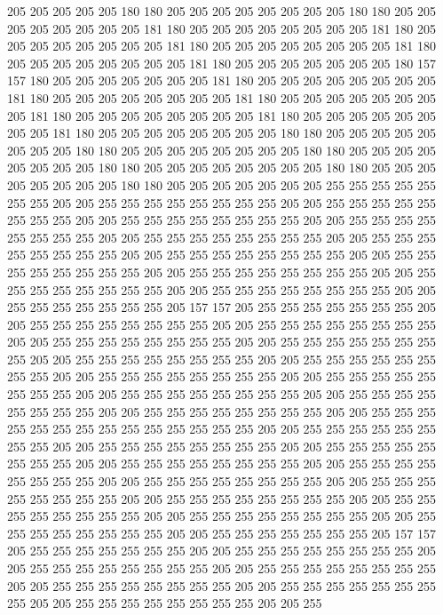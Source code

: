 205 205 205 205 205 180 180 205 205 205 205 205 205 205 205 180 180 205 205 205
205 205 205 205 205 181 180 205 205 205 205 205 205 205 205 181 180 205 205 205
205 205 205 205 205 181 180 205 205 205 205 205 205 205 205 181 180 205 205 205
205 205 205 205 205 181 180 205 205 205 205 205 205 205 180 157 157 180 205 205
205 205 205 205 205 181 180 205 205 205 205 205 205 205 205 181 180 205 205 205
205 205 205 205 205 181 180 205 205 205 205 205 205 205 205 181 180 205 205 205
205 205 205 205 205 181 180 205 205 205 205 205 205 205 205 181 180 205 205 205
205 205 205 205 205 180 180 205 205 205 205 205 205 205 205 180 180 205 205 205
205 205 205 205 205 180 180 205 205 205 205 205 205 205 205 180 180 205 205 205
205 205 205 205 205 180 180 205 205 205 205 205 205 205 205 180 180 205 205 205
205 205 205 205 255 255 255 255 255 255 255 205 205 255 255 255 255 255 255 255
255 205 205 255 255 255 255 255 255 255 255 205 205 255 255 255 255 255 255 255
255 205 205 255 255 255 255 255 255 255 255 205 205 255 255 255 255 255 255 255
255 205 205 255 255 255 255 255 255 255 255 205 205 255 255 255 255 255 255 255
255 205 205 255 255 255 255 255 255 255 255 205 205 255 255 255 255 255 255 255
255 205 205 255 255 255 255 255 255 255 255 205 205 255 255 255 255 255 255 255
255 205 205 255 255 255 255 255 255 255 205 157 157 205 255 255 255 255 255 255
255 205 205 255 255 255 255 255 255 255 255 205 205 255 255 255 255 255 255 255
255 205 205 255 255 255 255 255 255 255 255 205 205 255 255 255 255 255 255 255
255 205 205 255 255 255 255 255 255 255 255 205 205 255 255 255 255 255 255 255
255 205 205 255 255 255 255 255 255 255 255 205 205 255 255 255 255 255 255 255
255 205 205 255 255 255 255 255 255 255 255 205 205 255 255 255 255 255 255 255
255 205 205 255 255 255 255 255 255 255 255 205 205 255 255 255 255 255 255 255
255 255 255 255 255 255 255 205 205 255 255 255 255 255 255 255 255 205 205 255
255 255 255 255 255 255 255 205 205 255 255 255 255 255 255 255 255 205 205 255
255 255 255 255 255 255 255 205 205 255 255 255 255 255 255 255 255 205 205 255
255 255 255 255 255 255 255 205 205 255 255 255 255 255 255 255 255 205 205 255
255 255 255 255 255 255 255 205 205 255 255 255 255 255 255 255 255 205 205 255
255 255 255 255 255 255 255 205 205 255 255 255 255 255 255 255 255 205 205 255
255 255 255 255 255 255 205 157 157 205 255 255 255 255 255 255 255 205 205 255
255 255 255 255 255 255 255 205 205 255 255 255 255 255 255 255 255 205 205 255
255 255 255 255 255 255 255 205 205 255 255 255 255 255 255 255 255 205 205 255
255 255 255 255 255 255 255 205 205 255 255 255 255 255 255 255 255 205 205 255
